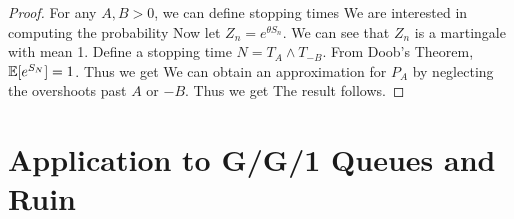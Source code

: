 \documentclass[a4paper,10pt,english]{article}
\begin{document}
\begin{proof}
For any $A,B > 0$, we can define stopping times
We are interested in computing the probability 
Now let $Z_n = e^{\theta S_n}$. We can see that $Z_n$ is a martingale with mean 1. 
Define a stopping time $N = T_A \wedge T_{-B}$. 
From Doob's Theorem, $\mathbb{E}[e^{S_N}] = 1$. 
Thus we get
We can obtain an approximation for $P_A$ by neglecting the overshoots past $A$ or $-B$. 
Thus we get
The result follows. 
\end{proof}


\section{Application to G/G/1 Queues and Ruin}
\end{document}
